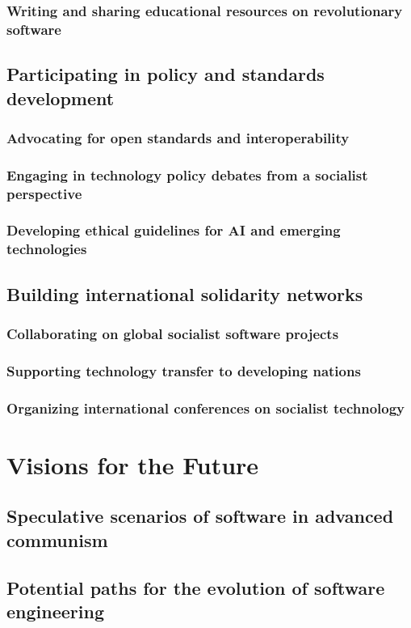 \subsubsection{Writing and sharing educational resources on revolutionary software}
\subsection{Participating in policy and standards development}
\subsubsection{Advocating for open standards and interoperability}
\subsubsection{Engaging in technology policy debates from a socialist perspective}
\subsubsection{Developing ethical guidelines for AI and emerging technologies}
\subsection{Building international solidarity networks}
\subsubsection{Collaborating on global socialist software projects}
\subsubsection{Supporting technology transfer to developing nations}
\subsubsection{Organizing international conferences on socialist technology}

\newpage

\section{Visions for the Future}
\subsection{Speculative scenarios of software in advanced communism}
\subsection{Potential paths for the evolution of software engineering}

